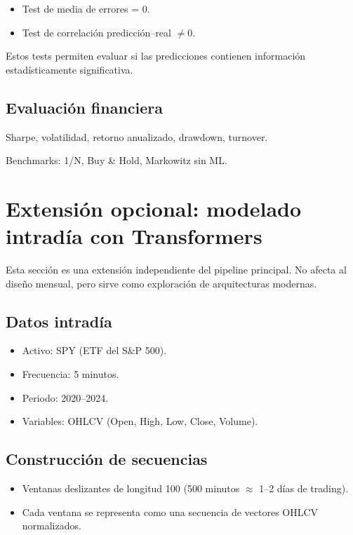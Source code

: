 \documentclass[12pt]{article}
\begin{document}
\begin{itemize}
    \item Test de media de errores = 0.
    \item Test de correlación predicción–real $\neq 0$.
\end{itemize}

Estos tests permiten evaluar si las predicciones contienen información estadísticamente significativa.

\subsection{Evaluación financiera}

Sharpe, volatilidad, retorno anualizado, drawdown, turnover.

Benchmarks: 1/N, Buy \& Hold, Markowitz sin ML.


\section{Extensión opcional: modelado intradía con Transformers}

Esta sección es una extensión independiente del pipeline principal. No afecta al diseño mensual, pero sirve como exploración de arquitecturas modernas.

\subsection{Datos intradía}

\begin{itemize}
    \item Activo: SPY (ETF del S\&P 500).
    \item Frecuencia: 5 minutos.
    \item Periodo: 2020--2024.
    \item Variables: OHLCV (Open, High, Low, Close, Volume).
\end{itemize}

\subsection{Construcción de secuencias}

\begin{itemize}
    \item Ventanas deslizantes de longitud 100 (500 minutos $\approx$ 1--2 días de trading).
    \item Cada ventana se representa como una secuencia de vectores OHLCV normalizados.
\end{itemize}
\end{document}
